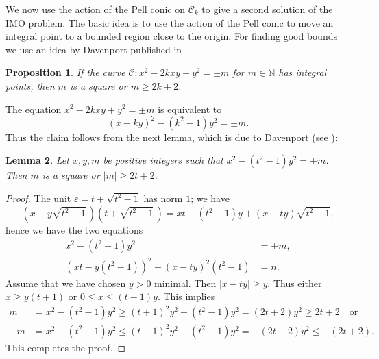 \documentclass{amsart}
\newtheorem{lemma}{Lemma}
\newtheorem{prop}[lemma]{Proposition}
\newcommand{\N}{{\mathbb N}}
\newcommand{\eps}{\varepsilon}
\newcommand{\cC}{{\mathcal C}}
\begin{document}
We now use the action of the Pell conic on $\cC_k$ to give a second solution
of the IMO problem. The basic idea is to use the action of the Pell
conic to move an integral point to a bounded region close to the origin.
For finding good bounds we use an idea by Davenport published in
\cite{Ankeny}.


\begin{prop}\label{Pr6}
  If the curve $\cC: x^2 - 2kxy + y^2 = \pm m$ for $m \in \N$ has integral
  points, then $m$ is a square or $m \ge 2k+2$.
\end{prop}

The equation $x^2 - 2kxy + y^2 = \pm m$ is equivalent to
\begin{equation}\label{Enorm}
  (x-ky)^2 - (k^2-1)y^2 = \pm m.
\end{equation}
Thus the claim follows from the next lemma, which is due to
Davenport (see \cite{Ankeny}):

\begin{lemma}\label{Lem7}
  Let $x, y, m$ be positive integers such that
  $x^2 - (t^2-1)y^2 = \pm m$. Then $m$ is a square or $|m| \ge 2t+2$.
\end{lemma}

\begin{proof}
  The unit $\eps = t + \sqrt{t^2-1}$ has norm $1$; we have
  $$ (x - y \sqrt{t^2-1}\,)(t + \sqrt{t^2-1}\,)
     = xt - (t^2-1)y + (x-ty) \sqrt{t^2-1}, $$
  hence we have the two equations
  \begin{align*}
    x^2 - (t^2-1)y^2 & = \pm m, \\
    (xt - y(t^2-1))^2 - (x-ty)^2(t^2-1) & = n.
  \end{align*}
  Assume that we have chosen $y > 0$ minimal. Then $|x-ty| \ge y$.
  Thus either $x \ge y(t+1)$ or $0 \le x \le (t-1)y$. This implies
  \begin{align*}
     m & = x^2 - (t^2-1)y^2 \ge (t+1)^2y^2 - (t^2-1)y^2
             = (2t+2)y^2 \ge 2t+2 \quad \text{or} \\
    -m & = x^2 - (t^2-1)y^2 \le (t-1)^2y^2 - (t^2-1)y^2
             = -(2t+2)y^2  \le -(2t+2).
  \end{align*}
  This completes the proof.  
\end{proof}


\end{document}
